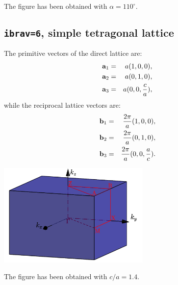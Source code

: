 \documentclass[12pt,a4paper]{article}
\begin{document}
The figure has been obtained with $\alpha=110^\circ$.

\subsection{\texttt{ibrav=6}, simple tetragonal lattice}
The primitive vectors of the direct lattice are:
\begin{eqnarray}
{\bf a}_1 &=& a (1, 0, 0), \nonumber \\
{\bf a}_2 &=& a (0, 1, 0), \nonumber \\
{\bf a}_3 &=& a (0, 0, {c\over a}), \nonumber
\nonumber
\end{eqnarray}
while the reciprocal lattice vectors are:
\begin{eqnarray}
{\bf b}_1 &=& {2\pi \over a} (1, 0, 0), \nonumber \\
{\bf b}_2 &=& {2\pi \over a} (0, 1, 0), \nonumber \\
{\bf b}_3 &=& {2\pi \over a} (0, 0, {a\over c}). \nonumber
\nonumber
\end{eqnarray}
\begin{center}
\includegraphics[width=7.5cm,angle=0]{images/st.png}
\end{center}
The figure has been obtained with $c/a=1.4$.
\end{document}
